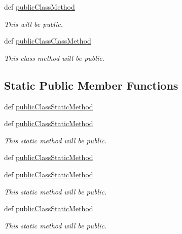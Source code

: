 \begin{DoxyCompactItemize}
def \hyperlink{classdoxypypy_1_1test_1_1sample__privacy_1_1_new_style_sample_a5c1fadfe88ff7a836674a07f412131be}{public\-Class\-Method}
\begin{DoxyCompactList}\small\item\em This will be public. \end{DoxyCompactList}\item 
def \hyperlink{classdoxypypy_1_1test_1_1sample__privacy_1_1_new_style_sample_ae84bba2b288c8b35b90b8b187004273f}{public\-Class\-Class\-Method}
\begin{DoxyCompactList}\small\item\em This class method will be public. \end{DoxyCompactList}\end{DoxyCompactItemize}
\subsection*{Static Public Member Functions}
\begin{DoxyCompactItemize}
\item 
def \hyperlink{classdoxypypy_1_1test_1_1sample__privacy_1_1_new_style_sample_ab83da18da7339bc5edddaeefe36c83bb}{public\-Class\-Static\-Method}
\item 
def \hyperlink{classdoxypypy_1_1test_1_1sample__privacy_1_1_new_style_sample_ab83da18da7339bc5edddaeefe36c83bb}{public\-Class\-Static\-Method}
\begin{DoxyCompactList}\small\item\em This static method will be public. \end{DoxyCompactList}\item 
def \hyperlink{classdoxypypy_1_1test_1_1sample__privacy_1_1_new_style_sample_ab83da18da7339bc5edddaeefe36c83bb}{public\-Class\-Static\-Method}
\item 
def \hyperlink{classdoxypypy_1_1test_1_1sample__privacy_1_1_new_style_sample_ab83da18da7339bc5edddaeefe36c83bb}{public\-Class\-Static\-Method}
\begin{DoxyCompactList}\small\item\em This static method will be public. \end{DoxyCompactList}\item 
def \hyperlink{classdoxypypy_1_1test_1_1sample__privacy_1_1_new_style_sample_ab83da18da7339bc5edddaeefe36c83bb}{public\-Class\-Static\-Method}
\begin{DoxyCompactList}\small\item\em This static method will be public. \end{DoxyCompactList}\end{DoxyCompactItemize}

